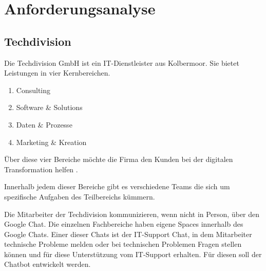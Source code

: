 
\chapter{Anforderungsanalyse}

\section*{Techdivision}
\label{s:konz:ausg}
Die Techdivision GmbH ist ein IT-Dienstleister aus Kolbermoor.
Sie bietet Leistungen in vier Kernbereichen. 
\begin{enumerate}
    \item Consulting
    \item Software \& Solutions
    \item Daten \& Prozesse
    \item Marketing \& Kreation
\end{enumerate}
Über diese vier Bereiche möchte die Firma den Kunden 
bei der digitalen Transformation helfen \cite{UnserPulsSchlaegt}. \par
Innerhalb jedem dieser Bereiche gibt es verschiedene Teams 
die sich um spezifische Aufgaben des Teilbereichs 
kümmern. \par
Die Mitarbeiter der Techdivision kommunizieren, wenn nicht in Person, 
über den Google Chat. Die einzelnen Fachbereiche haben eigene Spaces innerhalb 
des Google Chats. Einer dieser Chats ist der IT-Support Chat, in dem Mitarbeiter 
technische Probleme melden oder bei technischen Problemen Fragen stellen können und für diese 
Unterstützung vom IT-Support erhalten. Für diesen soll der Chatbot entwickelt werden.

